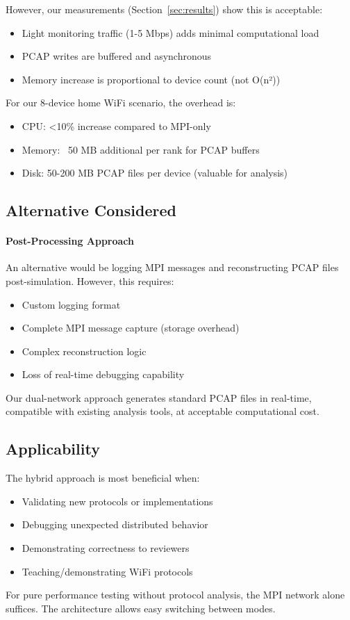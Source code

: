 However, our measurements (Section~\ref{sec:results}) show this is acceptable:
\begin{itemize}
    \item Light monitoring traffic (1-5 Mbps) adds minimal computational load
    \item PCAP writes are buffered and asynchronous
    \item Memory increase is proportional to device count (not O(n²))
\end{itemize}

For our 8-device home WiFi scenario, the overhead is:
\begin{itemize}
    \item CPU: <10\% increase compared to MPI-only
    \item Memory: ~50 MB additional per rank for PCAP buffers
    \item Disk: 50-200 MB PCAP files per device (valuable for analysis)
\end{itemize}

\subsection{Alternative Considered}

\paragraph{Post-Processing Approach}
An alternative would be logging MPI messages and reconstructing PCAP files post-simulation. However, this requires:
\begin{itemize}
    \item Custom logging format
    \item Complete MPI message capture (storage overhead)
    \item Complex reconstruction logic
    \item Loss of real-time debugging capability
\end{itemize}

Our dual-network approach generates standard PCAP files in real-time, compatible with existing analysis tools, at acceptable computational cost.

\subsection{Applicability}

The hybrid approach is most beneficial when:
\begin{itemize}
    \item Validating new protocols or implementations
    \item Debugging unexpected distributed behavior
    \item Demonstrating correctness to reviewers
    \item Teaching/demonstrating WiFi protocols
\end{itemize}

For pure performance testing without protocol analysis, the MPI network alone suffices. The architecture allows easy switching between modes.
